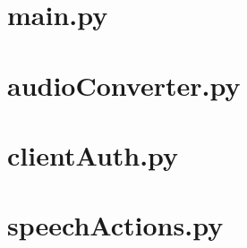 	\section{main.py}
	
	
	\section{audioConverter.py}
	
	
	\section{clientAuth.py}
	
	
	\section{speechActions.py}
	
